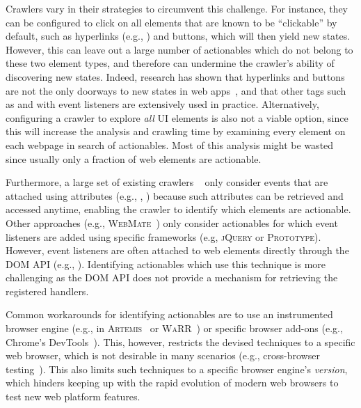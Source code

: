 Crawlers vary in their strategies to circumvent this challenge.
For instance, they can be configured to click on all
elements that are known to be ``clickable'' by default,
such as hyperlinks (e.g., )
 and buttons, which will then yield new states.
However, this can leave out a large number of actionables
which do not belong to these two element types,
and therefore can undermine the crawler's ability
 of discovering new states.
Indeed, research has shown that hyperlinks and buttons
are not the only doorways to new states in web
 apps~\cite{Behfarshad:2013:HiddenWeb},
and that other tags such as  and 
with event listeners are extensively used in practice.
Alternatively, configuring a crawler to explore
\emph{all} UI elements is also not a viable option,
since this will increase the
analysis and crawling time by examining
every element on each webpage
in search of actionables.
Most of this analysis might be wasted
since usually only a fraction of web elements are actionable.

Furthermore, a large set of existing crawlers
~\cite{Frey:2007-IndexingAjaxApps,
 Duda:2008:AjaxSearchTool, Moosavi:2013:ComponentBasedCrawling,
  Moosavi:2014:ComponentBasedCrawlingICWE}
only consider events that are attached using \html attributes 
(e.g., , ) because such attributes
can be retrieved and accessed anytime, enabling the crawler
to identify which elements are actionable.
Other approaches (e.g., \textsc{WebMate}~\cite{Dallmeier:2013:WebMate, dallmeier2014webmate})
only consider actionables for which event listeners are
added using specific \js frameworks
(e.g, \textsc{jQuery} or \textsc{Prototype}).
However, event listeners are often attached to web elements
directly through the DOM API (e.g., ).
Identifying actionables which use this technique
is more challenging as the DOM API
does not provide a mechanism for retrieving the registered handlers.
 
Common workarounds for identifying actionables are
 to use an instrumented browser engine 
(e.g., in \textsc{Artemis}~\cite{artzi2011framework}
 or \textsc{WaRR}~\cite{Andrica:2011:WaRR})
or specific browser add-ons (e.g., Chrome's 
DevTools~\cite{chrome-dev-tools}).
This, however, restricts the devised techniques
to a specific web browser, which is not desirable
in many scenarios (e.g., cross-browser 
testing~\cite{Mesbah:2011:CrossT, Choudhary:2012:CrossCheck}). 
This also limits such techniques to a specific browser engine's \textit{version}, which hinders keeping up 
with the rapid evolution of modern web browsers
to test new web platform features.


